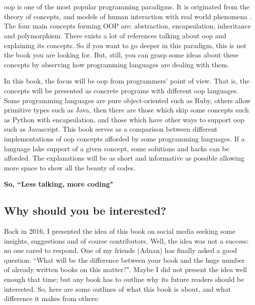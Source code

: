 \documentclass[12pt]{book}
\begin{document}
\fi

\chapter*{}

{

\ac{oop} is one of the most popular programming paradigms. 
It is originated from the theory of concepts, and models of human interaction with real world phenomena \citep{2013-normark}.
The four main concepts forming OOP are: abstraction, encapsulation, inheritance and polymorphism.
There exists a lot of references talking about \ac{oop} and explaining its concepts.
So if you want to go deeper in this paradigm, this is not the book you are looking for. 
But, still, you can grasp some ideas about these concepts by observing how programming languages are dealing with them.


In this book, the focus will be \ac{oop} from programmers' point of view.
That is, the concepts will be presented as concrete programs with different \ac{oop} languages. 
Some programming languages are pure object-oriented such as Ruby, others allow primitive types such as Java, then there are those which skip some concepts such as Python with encapsulation, and those which have other ways to support \ac{oop} such as Javascript.
This book serves as a comparison between different implementations of \ac{oop} concepts afforded by some programming languages.
If a language lake support of a given concept, some solutions and hacks can be afforded. 
The explanations will be as short and informative as possible allowing more space to show all the beauty of codes.

}
\vfill
\begin{flushright}
	\LARGE\bfseries\color{indigo}
So, ``Less talking, more coding"
\end{flushright}

\newpage

\section*{Why should you be interested?}

Back in 2016, I presented the idea of this book on social media seeking some insights, suggestions and of course contributors.
Well, the idea was not a success: no one cared to respond. 
One of my friends (Adnan) has finally asked a good question: ``What will be the difference between your book and the huge number of already written books on this matter?".
Maybe I did not present the idea well enough that time; but any book has to outline why its future readers should be interested. 
So, here are some outlines of what this book is about, and what difference it makes from others:
\end{document}
